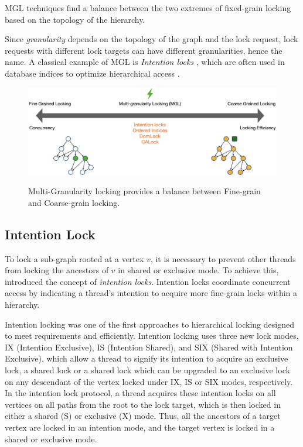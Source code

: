  MGL techniques find a balance between the two extremes of fixed-grain locking based on the topology of the hierarchy.
 
Since \emph{granularity} depends on the topology of the graph and the lock request, lock requests with different lock targets can have different granularities, hence the name. A classical example of MGL is \emph{Intention locks} \cite{StonebrakerGranularity}, which are often used in database indices to optimize hierarchical access \cite{sqlintentionlocks}. 

\begin{figure}[h]
    \captionsetup{justification=centering}
    \includegraphics[width=\textwidth]{figures/MGLSpectrum.png}
    \label{fig:mglspectrum}
    \caption{Multi-Granularity locking provides a balance between Fine-grain and Coarse-grain locking.}
\end{figure}



\subsection{Intention Lock}

To lock a sub-graph rooted at a vertex $v$, it is necessary to prevent other threads from locking the ancestors of $v$ in shared or exclusive mode. To achieve this, \citet{gray1975granularity} introduced the concept of \emph{intention locks}. Intention locks coordinate concurrent access by indicating a thread's intention to acquire more fine-grain locks within a hierarchy. 

Intention locking was one of the first approaches to hierarchical locking designed to meet requirements \Rb and \Rc efficiently. Intention locking uses three new lock modes, IX (Intention Exclusive), IS (Intention Shared), and SIX (Shared with Intention Exclusive), which allow a thread to signify its intention to acquire an exclusive lock, a shared lock or a shared lock which can be upgraded to an exclusive lock on any descendant of the vertex locked under IX, IS or SIX modes, respectively. In the intention lock protocol, a thread acquires these intention locks on all vertices on all paths from the root to the lock target, which is then locked in either a shared (S) or exclusive (X) mode. Thus, all the ancestors of a target vertex are locked in an intention mode, and the target vertex is locked in a shared or exclusive mode.


